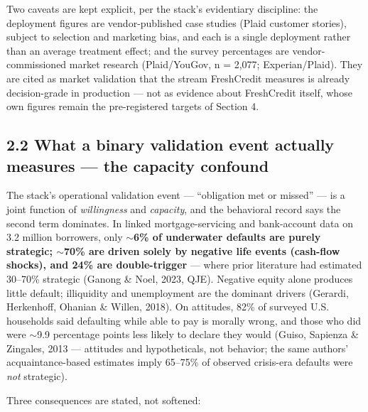 \documentclass[
]{article}
\begin{document}
Two caveats are kept explicit, per the stack's evidentiary discipline:
the deployment figures are vendor-published case studies (Plaid customer
stories), subject to selection and marketing bias, and each is a single
deployment rather than an average treatment effect; and the survey
percentages are vendor-commissioned market research (Plaid/YouGov, n =
2,077; Experian/Plaid). They are cited as market validation that the
stream FreshCredit measures is already decision-grade in production ---
not as evidence about FreshCredit itself, whose own figures remain the
pre-registered targets of Section 4.

\subsection{2.2 What a binary validation event actually measures --- the
capacity
confound}\label{what-a-binary-validation-event-actually-measures-the-capacity-confound}

The stack's operational validation event --- ``obligation met or
missed'' --- is a joint function of \emph{willingness} and
\emph{capacity}, and the behavioral record says the second term
dominates. In linked mortgage-servicing and bank-account data on 3.2
million borrowers, only \textbf{\(\sim\)6\% of underwater defaults are
purely strategic; \(\sim\)70\% are driven solely by negative life events
(cash-flow shocks), and 24\% are double-trigger} --- where prior
literature had estimated 30--70\% strategic (Ganong \& Noel, 2023, QJE).
Negative equity alone produces little default; illiquidity and
unemployment are the dominant drivers (Gerardi, Herkenhoff, Ohanian \&
Willen, 2018). On attitudes, 82\% of surveyed U.S. households said
defaulting while able to pay is morally wrong, and those who did were
\(\sim\)9.9 percentage points less likely to declare they would (Guiso,
Sapienza \& Zingales, 2013 --- attitudes and hypotheticals, not
behavior; the same authors' acquaintance-based estimates imply 65--75\%
of observed crisis-era defaults were \emph{not} strategic).

Three consequences are stated, not softened:
\end{document}
